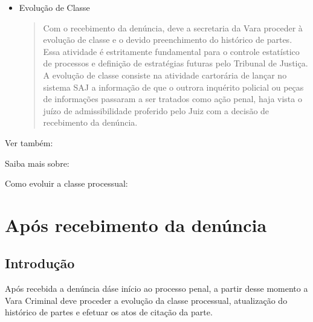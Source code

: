 \documentclass[letterpaper,10pt,brazil]{sphinxmanual}
\begin{document}
\begin{itemize}
\item {} 
\sphinxAtStartPar
Evolução de Classe
\begin{quote}

\sphinxAtStartPar
Com o recebimento da denúncia, deve a secretaria da Vara proceder à evolução de classe e o devido preenchimento do histórico de partes. Essa atividade é estritamente fundamental para o controle estatístico de processos e definição de estratégias futuras pelo Tribunal de Justiça.
A evolução de classe consiste na atividade cartorária de lançar no sistema SAJ a informação de que o outrora inquérito policial ou peças de informações passaram a ser tratados como ação penal, haja vista o juízo de admissibilidade proferido pelo Juiz com a decisão de recebimento da denúncia.
\end{quote}

\end{itemize}


\begin{sphinxseealso}{Ver também:}

\sphinxAtStartPar
Saiba mais sobre:

\sphinxAtStartPar
Como evoluir a classe processual: {\hyperref[\detokenize{projud_19_evolucao_retificacao::doc}]{}}


\end{sphinxseealso}


\sphinxstepscope


\section{Após recebimento da denúncia}
\label{\detokenize{03recebimento_denuncia:apos-recebimento-da-denuncia}}\label{\detokenize{03recebimento_denuncia::doc}}

\subsection{Introdução}
\label{\detokenize{03recebimento_denuncia:introducao}}
\sphinxAtStartPar
Após recebida a denúncia dá\sphinxhyphen{}se início ao processo penal, a partir desse momento a Vara Criminal deve proceder a evolução da classe processual, atualização do histórico de partes e efetuar os atos de citação da parte.
\end{document}
